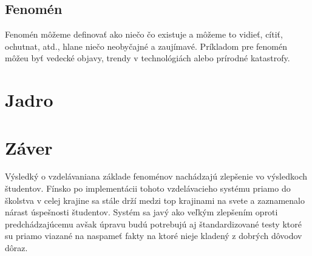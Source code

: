\documentclass[10pt,slovak,a4paper]{article}
\begin{document}
\subsection{Fenomén}

Fenomén môžeme definovať ako niečo čo existuje a môžeme to vidieť, cítiť, ochutnat, atd., hlane niečo neobyčajné
a zaujímavé. Príkladom pre fenomén môžeu byť vedecké objavy, trendy v technológiách alebo prírodné katastrofy.\cite{pblf}



\section{Jadro}



\section{Záver}

Výsledký o vzdelávaniana základe fenoménov nachádzajú zlepšenie vo výsledkoch študentov. Fínsko po implementácii
tohoto vzdelávacieho systému priamo do školstva v celej krajine sa stále drží medzi top krajinami na svete a zaznamenalo 
nárast úspešnosti študentov. Systém sa javý ako veľkým zlepšením oproti predchádzajúcemu avšak úpravu budú potrebujú aj
štandardizované testy ktoré su priamo viazané na naspameť fakty na ktoré nieje kladený z dobrých dôvodov dôraz.



\end{document}
